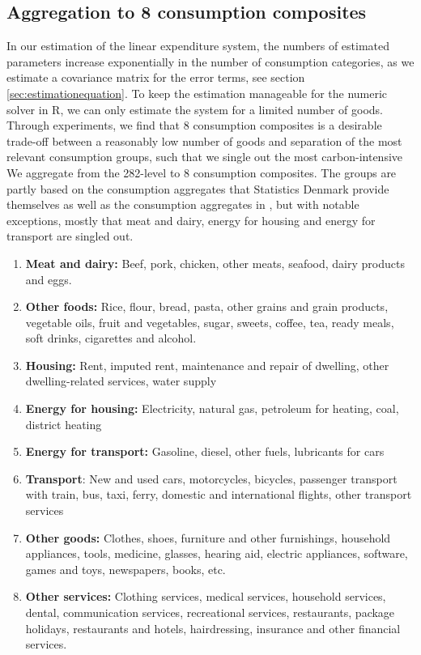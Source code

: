 \subsection{Aggregation to 8 consumption composites}\label{sec:consgroups}
In our estimation of the linear expenditure system, the numbers of estimated parameters increase exponentially in the number of consumption categories, as we estimate a covariance matrix for the error terms, see section \ref{sec:estimationequation}. To keep the estimation 
manageable for the numeric solver in R, we can only estimate the system for a limited number of goods. Through experiments, we find that 8 consumption composites is a desirable trade-off between a reasonably low number of goods and separation of the most relevant consumption groups, such that we single out the most carbon-intensive We aggregate from the 282-level to 8 consumption composites. The groups are partly based on the consumption aggregates that Statistics Denmark provide themselves as well as the consumption aggregates in \cite{makroforbrug2020}, but with notable exceptions, mostly that meat and dairy, energy for housing and energy for transport are singled out. 
\begin{enumerate}
  \item \textbf{Meat and dairy:} Beef, pork, chicken, other meats, seafood, dairy products and eggs.
  \item \textbf{Other foods:} Rice, flour, bread, pasta, other grains and grain products, vegetable oils, fruit and vegetables, sugar, sweets, coffee, tea, ready meals, soft drinks, cigarettes and alcohol.
  \item \textbf{Housing:} Rent, imputed rent, maintenance and repair of dwelling, other dwelling-related services, water supply
  \item \textbf{Energy for housing:} Electricity, natural gas, petroleum for heating, coal, district heating
  \item \textbf{Energy for transport:} Gasoline, diesel, other fuels, lubricants for cars
  \item \textbf{Transport}: New and used cars, motorcycles, bicycles, passenger transport with train, bus, taxi, ferry, domestic and international flights, other transport services
  \item \textbf{Other goods:} Clothes, shoes, furniture and other furnishings,  household appliances, tools, medicine, glasses, hearing aid, electric appliances, software, games and toys, newspapers, books, etc.
  \item \textbf{Other services:} Clothing services, medical services, household services, dental, communication services, recreational services, restaurants, package holidays, restaurants and hotels, hairdressing, insurance and other financial services.
\end{enumerate}

